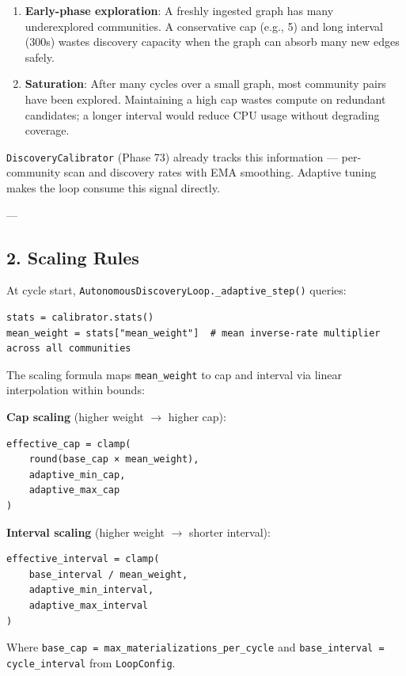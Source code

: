 \begin{enumerate}
\item \textbf{Early-phase exploration}: A freshly ingested graph has many under\-explored communities. A conse\-rvative cap (e.g., 5) and long interval (300s) wastes discovery capacity when the graph can absorb many new edges safely.

\item \textbf{Saturation}: After many cycles over a small graph, most community pairs have been explored. Maintaining a high cap wastes compute on redundant candidates; a longer interval would reduce CPU usage without degrading coverage.

\end{enumerate}
\texttt{DiscoveryCalibrator} (Phase 73) already tracks this information — per-community scan and discovery rates with EMA smoothing. Adaptive tuning makes the loop consume this signal directly.

---

\subsection{2. Scaling Rules}

At cycle start, \texttt{AutonomousDiscoveryLoop.\_adaptive\_step()} queries:

\begin{lstlisting}
stats = calibrator.stats()
mean_weight = stats["mean_weight"]  # mean inverse-rate multiplier across all communities
\end{lstlisting}

The scaling formula maps \texttt{mean\_weight} to cap and interval via linear inter\-polation within bounds:

\textbf{Cap scaling} (higher weight $\to$ higher cap):
\begin{lstlisting}
effective_cap = clamp(
    round(base_cap × mean_weight),
    adaptive_min_cap,
    adaptive_max_cap
)
\end{lstlisting}

\textbf{Interval scaling} (higher weight $\to$ shorter interval):
\begin{lstlisting}
effective_interval = clamp(
    base_interval / mean_weight,
    adaptive_min_interval,
    adaptive_max_interval
)
\end{lstlisting}

Where \texttt{base\_cap = max\_materializations\_per\_cycle} and \texttt{base\_interval = cycle\_interval} from \texttt{LoopConfig}.

